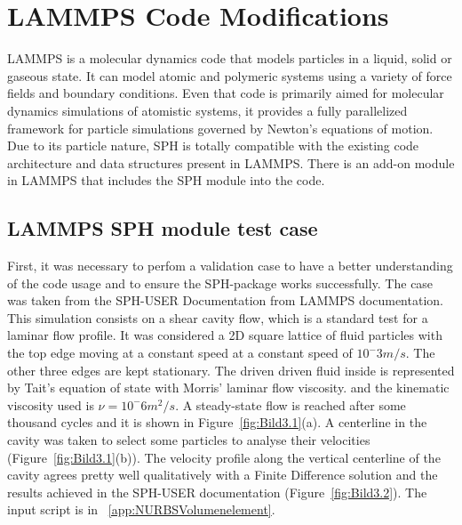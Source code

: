 
\chapter{LAMMPS Code Modifications}
\label{chap:chapter_3}

LAMMPS is a molecular dynamics code that models particles in a liquid, solid or gaseous state\cite{lammps_manual}. It can model atomic and polymeric systems using a variety of force fields and
boundary conditions. Even that code is primarily aimed for molecular dynamics simulations of atomistic systems, it provides a fully parallelized framework for particle simulations
governed by Newton's equations of motion. Due to its particle nature, SPH is totally compatible with the existing code architecture and data structures present in LAMMPS. There is 
an add-on module in LAMMPS that includes the SPH module into the code.\par

\section{LAMMPS SPH module test case}
\label{sec:section_1}

First, it was necessary to perfom a validation case to have a better understanding of the code usage and to ensure the SPH-package works successfully. The case was taken from 
the SPH-USER Documentation from LAMMPS documentation\cite{ganzenmuller_implementation_2011}. This simulation consists on a shear cavity flow, which is a standard test for a laminar
flow profile. It was considered a 2D square lattice of fluid particles with the top edge moving at a constant speed at a constant speed of $10^-3m/s$. The other three edges are kept
stationary. The driven driven fluid inside is represented by Tait's equation of state \cite{neece_tait_1968} with Morris' laminar flow viscosity. and the kinematic viscosity used is
$\nu=10^-6m^2/s$. A steady-state flow is reached after some thousand cycles and it is shown in Figure~\ref{fig:Bild3.1}(a). A centerline in the cavity was taken to select some particles
to analyse their velocities (Figure~\ref{fig:Bild3.1}(b)). The velocity profile along the vertical centerline of the cavity 
agrees pretty well qualitatively with a Finite Difference solution and the results achieved in the SPH-USER documentation (Figure~\ref{fig:Bild3.2}). The input script is in ~\ref{app:NURBSVolumenelement}.


